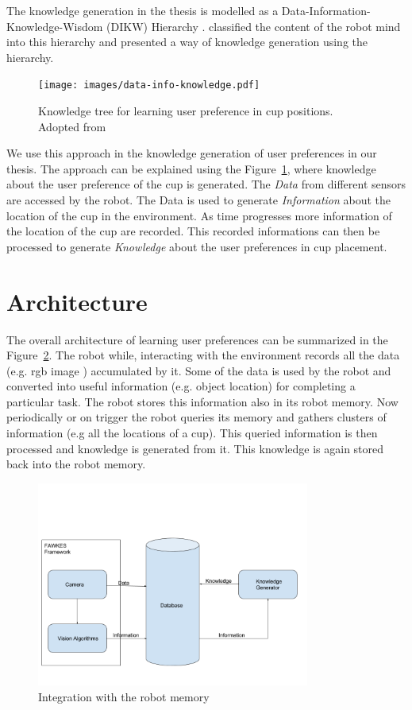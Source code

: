 The knowledge generation in the thesis is modelled as a Data-Information-Knowledge-Wisdom (DIKW) Hierarchy\citep{rowley2007wisdom} \citep{ackoff1989data}. \cite{niemueller2012generic} classified the content of the robot mind into this hierarchy and presented a way of knowledge generation using the hierarchy. 
\begin{figure}[htp]
\centering
\texttt{[image: images/data-info-knowledge.pdf]}
\caption{Knowledge tree for learning user preference in cup positions. Adopted from \citep{niemueller2012generic}}
\label{fig:dikw}
\end{figure}
We use this approach in the knowledge generation of user preferences in our thesis. The approach can be explained using the Figure~\ref{fig:dikw}, where knowledge about the user preference of the cup is generated. The \emph{Data} from different sensors are accessed by the robot. The Data is used to generate \emph{Information} about the location of the cup in the environment. As time progresses more information of the location of the cup are recorded. This recorded informations can then be processed to generate \emph{Knowledge} about the user preferences in cup placement.



\section{Architecture}
\label{cha:}
The overall architecture of learning user preferences can be summarized in the Figure~\ref{fig:architecture}. The robot while, interacting with the environment records all the data (e.g. rgb image ) accumulated by it. Some of the data is used by the robot and converted into useful information (e.g. object location) for completing a particular task. The robot stores this information also in its robot memory. Now periodically or on trigger the robot queries its memory and gathers clusters of information (e.g all the locations of a cup). This queried information is then processed and knowledge is generated from it. This knowledge is again stored back into the robot memory.

\begin{figure}[htp]
\centering
\includegraphics[width=0.8\textwidth]{images/integration.png}
\caption{Integration with the robot memory}
\label{fig:architecture}
\end{figure}



